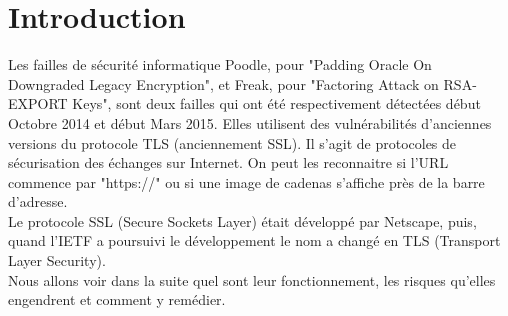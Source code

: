 \section*{Introduction}

Les failles de sécurité informatique Poodle, pour "Padding Oracle On Downgraded Legacy Encryption", et Freak, pour "Factoring Attack on RSA-EXPORT Keys", sont deux failles qui ont été respectivement détectées début Octobre 2014 et début Mars 2015. Elles utilisent des vulnérabilités d'anciennes versions du protocole TLS (anciennement SSL). Il s'agit de protocoles de sécurisation des échanges sur Internet. On peut les reconnaitre si l'URL commence par "https://" ou si une image de cadenas s'affiche près de la barre d'adresse.\\ 
Le protocole SSL (Secure Sockets Layer) était développé par Netscape, puis, quand l'IETF a poursuivi le développement le nom a changé en TLS (Transport Layer Security). \\
Nous allons voir dans la suite quel sont leur fonctionnement, les risques qu'elles engendrent et comment y remédier. 
